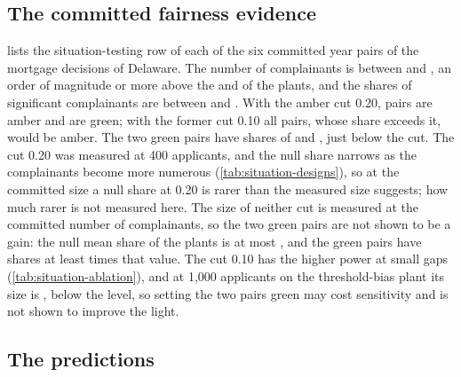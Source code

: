 \subsection{The committed fairness evidence}

 lists the situation-testing row of each of the six committed year pairs of the mortgage decisions of Delaware. The number of complainants is between \CmFairQMin{} and \CmFairQMax{}, an order of magnitude or more above the \SiComplainantsSmallZ{} and \SiComplainantsLargeZ{} of the plants, and the shares of significant complainants are between \CmFairMin{} and \CmFairMax{}. With the amber cut 0.20, \CmFairAmber{} pairs are amber and \CmFairGreen{} are green; with the former cut 0.10 all \CmFairAboveTen{} pairs, whose share exceeds it, would be amber. The two green pairs have shares of \CmFairGreenLo{} and \CmFairGreenHi{}, just below the cut. The cut 0.20 was measured at 400 applicants, and the null share narrows as the complainants become more numerous (\cref{tab:situation-designs}), so at the committed size a null share at 0.20 is rarer than the measured size suggests; how much rarer is not measured here. The size of neither cut is measured at the committed number of complainants, so the two green pairs are not shown to be a gain: the null mean share of the plants is at most \SiNullMeanMax{}, and the green pairs have shares at least \CmFairGreenOverNull{} times that value. The cut 0.10 has the higher power at small gaps (\cref{tab:situation-ablation}), and at 1,000 applicants on the threshold-bias plant its size is \SiRateCutTenLargeZ{}, below the level, so setting the two pairs green may cost sensitivity and is not shown to improve the light.



\subsection{The predictions}

